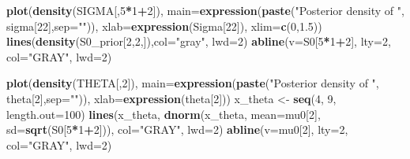 \documentclass[12pt]{article}
\newenvironment{Shaded}{\begin{snugshade}}{\end{snugshade}}
\newcommand{\AttributeTok}[1]{\textcolor[rgb]{0.13,0.29,0.53}{#1}}
\newcommand{\DecValTok}[1]{\textcolor[rgb]{0.00,0.00,0.81}{#1}}
\newcommand{\FloatTok}[1]{\textcolor[rgb]{0.00,0.00,0.81}{#1}}
\newcommand{\FunctionTok}[1]{\textcolor[rgb]{0.13,0.29,0.53}{\textbf{#1}}}
\newcommand{\NormalTok}[1]{#1}
\newcommand{\OtherTok}[1]{\textcolor[rgb]{0.56,0.35,0.01}{#1}}
\newcommand{\SpecialCharTok}[1]{\textcolor[rgb]{0.81,0.36,0.00}{\textbf{#1}}}
\newcommand{\StringTok}[1]{\textcolor[rgb]{0.31,0.60,0.02}{#1}}
\begin{document}
\begin{Shaded}
\begin{Highlighting}[]
\FunctionTok{plot}\NormalTok{(}\FunctionTok{density}\NormalTok{(SIGMA[,}\DecValTok{5}\SpecialCharTok{*}\DecValTok{1}\SpecialCharTok{+}\DecValTok{2}\NormalTok{]), }
     \AttributeTok{main=}\FunctionTok{expression}\NormalTok{(}\FunctionTok{paste}\NormalTok{(}\StringTok{"Posterior density of "}\NormalTok{, sigma[}\DecValTok{22}\NormalTok{],}\AttributeTok{sep=}\StringTok{""}\NormalTok{)), }
     \AttributeTok{xlab=}\FunctionTok{expression}\NormalTok{(Sigma[}\DecValTok{22}\NormalTok{]), }\AttributeTok{xlim=}\FunctionTok{c}\NormalTok{(}\DecValTok{0}\NormalTok{,}\FloatTok{1.5}\NormalTok{))}
\FunctionTok{lines}\NormalTok{(}\FunctionTok{density}\NormalTok{(S0\_prior[}\DecValTok{2}\NormalTok{,}\DecValTok{2}\NormalTok{,]),}\AttributeTok{col=}\StringTok{"gray"}\NormalTok{, }\AttributeTok{lwd=}\DecValTok{2}\NormalTok{)}
\FunctionTok{abline}\NormalTok{(}\AttributeTok{v=}\NormalTok{S0[}\DecValTok{5}\SpecialCharTok{*}\DecValTok{1}\SpecialCharTok{+}\DecValTok{2}\NormalTok{], }\AttributeTok{lty=}\DecValTok{2}\NormalTok{, }\AttributeTok{col=}\StringTok{"GRAY"}\NormalTok{, }\AttributeTok{lwd=}\DecValTok{2}\NormalTok{)}

\FunctionTok{plot}\NormalTok{(}\FunctionTok{density}\NormalTok{(THETA[,}\DecValTok{2}\NormalTok{]), }
     \AttributeTok{main=}\FunctionTok{expression}\NormalTok{(}\FunctionTok{paste}\NormalTok{(}\StringTok{"Posterior density of "}\NormalTok{, theta[}\DecValTok{2}\NormalTok{],}\AttributeTok{sep=}\StringTok{""}\NormalTok{)), }
     \AttributeTok{xlab=}\FunctionTok{expression}\NormalTok{(theta[}\DecValTok{2}\NormalTok{]))}
\NormalTok{x\_theta }\OtherTok{\textless{}{-}} \FunctionTok{seq}\NormalTok{(}\DecValTok{4}\NormalTok{, }\DecValTok{9}\NormalTok{, }\AttributeTok{length.out=}\DecValTok{100}\NormalTok{)}
\FunctionTok{lines}\NormalTok{(x\_theta, }\FunctionTok{dnorm}\NormalTok{(x\_theta, }\AttributeTok{mean=}\NormalTok{mu0[}\DecValTok{2}\NormalTok{], }\AttributeTok{sd=}\FunctionTok{sqrt}\NormalTok{(S0[}\DecValTok{5}\SpecialCharTok{*}\DecValTok{1}\SpecialCharTok{+}\DecValTok{2}\NormalTok{])), }
      \AttributeTok{col=}\StringTok{"GRAY"}\NormalTok{, }\AttributeTok{lwd=}\DecValTok{2}\NormalTok{)}
\FunctionTok{abline}\NormalTok{(}\AttributeTok{v=}\NormalTok{mu0[}\DecValTok{2}\NormalTok{], }\AttributeTok{lty=}\DecValTok{2}\NormalTok{, }\AttributeTok{col=}\StringTok{"GRAY"}\NormalTok{, }\AttributeTok{lwd=}\DecValTok{2}\NormalTok{)}


\end{Highlighting}
\end{Shaded}
\end{document}
